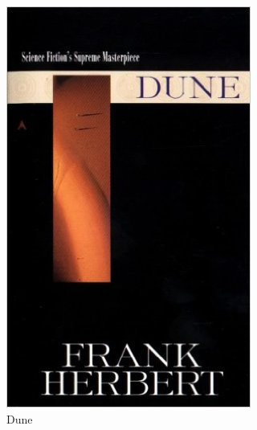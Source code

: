 \documentclass[11pt,a4paper]{article}
\begin{document}
\begin{figure}[H]
\begin{subfigure}{0.33\textwidth}
\centering
\includegraphics[width=.8\linewidth]{fueled44}
\caption{Dune}
\end{subfigure}
\begin{subfigure}{0.33\textwidth}
\centering

\end{subfigure}
\end{figure}
\end{document}

